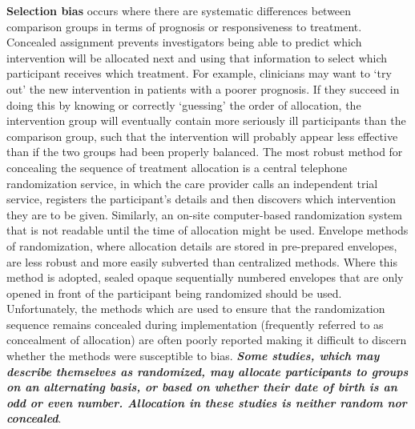 \documentclass[
  10pt,
  a4paper,
  DIV=11,
  numbers=noendperiod]{scrreprt}
\begin{document}
\textbf{Selection bias} occurs where there are systematic differences
between comparison groups in terms of prognosis or responsiveness to
treatment. Concealed assignment prevents investigators being able to
predict which intervention will be allocated next and using that
information to select which participant receives which treatment. For
example, clinicians may want to `try out' the new intervention in
patients with a poorer prognosis. If they succeed in doing this by
knowing or correctly `guessing' the order of allocation, the
intervention group will eventually contain more seriously ill
participants than the comparison group, such that the intervention will
probably appear less effective than if the two groups had been properly
balanced. The most robust method for concealing the sequence of
treatment allocation is a central telephone randomization service, in
which the care provider calls an independent trial service, registers
the participant's details and then discovers which intervention they are
to be given. Similarly, an on-site computer-based randomization system
that is not readable until the time of allocation might be used.
Envelope methods of randomization, where allocation details are stored
in pre-prepared envelopes, are less robust and more easily subverted
than centralized methods. Where this method is adopted, sealed opaque
sequentially numbered envelopes that are only opened in front of the
participant being randomized should be used. Unfortunately, the methods
which are used to ensure that the randomization sequence remains
concealed during implementation (frequently referred to as concealment
of allocation) are often poorly reported making it difficult to discern
whether the methods were susceptible to bias. \textbf{\emph{Some
studies, which may describe themselves as randomized, may allocate
participants to groups on an alternating basis, or based on whether
their date of birth is an odd or even number. Allocation in these
studies is neither random nor concealed}}.
\end{document}
